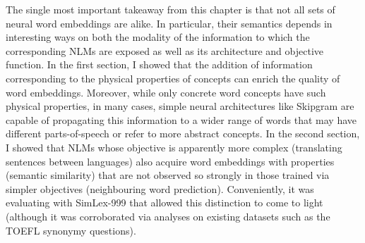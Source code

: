 The single most important takeaway from this chapter is that not all sets of neural word embeddings are alike. In particular, their semantics depends in interesting ways on both the modality of the information to which the corresponding NLMs are exposed as well as its architecture and objective function. In the first section, I showed that the addition of information corresponding to the physical properties of concepts can enrich the quality of word embeddings. Moreover, while only concrete word concepts have such physical properties, in many cases, simple neural architectures like Skipgram are capable of propagating this information to a wider range of words that may have different parts-of-speech or refer to more abstract concepts. In the second section, I showed that NLMs whose objective is apparently more complex (translating sentences between languages) also acquire word embeddings with properties (semantic similarity) that are not observed so strongly in those trained via simpler objectives (neighbouring word prediction). Conveniently, it was evaluating with SimLex-999 that allowed this distinction to come to light (although it was corroborated via analyses on existing datasets such as the TOEFL synonymy questions). 



